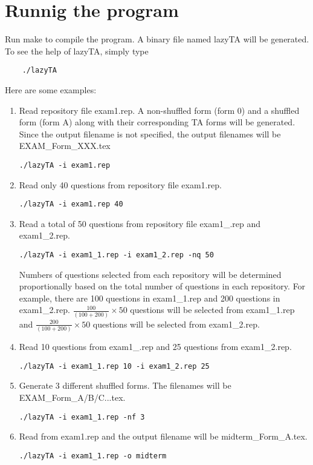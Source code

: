 \documentclass[11pt,letterpaper]{article}
\begin{document}
\section{Runnig the program}
Run make to compile the program. A binary file named lazyTA will be generated. To see the help of lazyTA, simply type
\begin{verbatim}
    ./lazyTA
\end{verbatim}
Here are some examples:
\begin{enumerate}
    \item Read repository file exam1.rep. A non-shuffled form (form 0) and a shuffled form (form A) along with their corresponding TA forms will be generated. Since the output filename is not specified, the output filenames will be EXAM\_Form\_XXX.tex
    \begin{verbatim}
./lazyTA -i exam1.rep
    \end{verbatim}

    \item Read only 40 questions from repository file exam1.rep. 
    \begin{verbatim}
./lazyTA -i exam1.rep 40
    \end{verbatim}

    \item Read a total of 50 questions from repository file exam1\_.rep and exam1\_2.rep. 
    \begin{verbatim}
./lazyTA -i exam1_1.rep -i exam1_2.rep -nq 50
    \end{verbatim}Numbers of questions selected from each repository will be determined proportionally based on the total number of questions in each repository. For example, there are 100 questions in exam1\_1.rep and 200 questions in exam1\_2.rep. $\frac{100}{(100+200)} \times 50$ questions will be selected from exam1\_1.rep and $\frac{200}{(100+200)} \times 50$ questions will be selected from exam1\_2.rep. 

    \item Read 10 questions from exam1\_.rep and 25 questions from exam1\_2.rep. 
    \begin{verbatim}
./lazyTA -i exam1_1.rep 10 -i exam1_2.rep 25
    \end{verbatim}

    \item Generate 3 different shuffled forms. The filenames will be EXAM\_Form\_A/B/C...tex.
    \begin{verbatim}
./lazyTA -i exam1_1.rep -nf 3
    \end{verbatim}

    \item Read from exam1.rep and the output filename will be midterm\_Form\_A.tex. 
    \begin{verbatim}
./lazyTA -i exam1_1.rep -o midterm
    \end{verbatim}

\end{enumerate}
\end{document}
